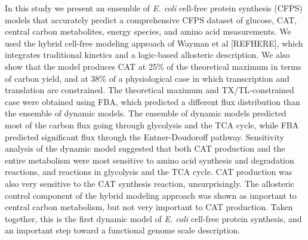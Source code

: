\documentclass[12pt]{article}
\begin{document}
In this study we present an ensemble of \textit{E. coli} cell-free protein synthesis (CFPS) models that accurately predict a comprehensive CFPS dataset of glucose, CAT, central carbon metabolites, energy species, and amino acid measurements.
We used the hybrid cell-free modeling approach of Wayman et al [REFHERE], which integrates traditional kinetics and a logic-based allosteric description.
We also show that the model produces CAT at 25\% of the theoretical maximum in terms of carbon yield, and at 38\% of a physiological case in which transcription and translation are constrained.
The theoretical maximum and TX/TL-constrained case were obtained using FBA, which predicted a different flux distribution than the ensemble of dynamic models.
The ensemble of dynamic models predicted most of the carbon flux going through glycolysis and the TCA cycle, while FBA predicted significant flux through the Entner-Doudoroff pathway.
Sensitivity analysis of the dynamic model suggested that both CAT production and the entire metabolism were most sensitive to amino acid synthesis and degradation reactions, and reactions in glycolysis and the TCA cycle.
CAT production was also very sensitive to the CAT synthesis reaction, unsurprisingly.
The allosteric control component of the hybrid modeling approach was shown as important to central carbon metabolism, but not very important to CAT production.
Taken together, this is the first dynamic model of \textit{E. coli} cell-free protein synthesis, and an important step toward a functional genome scale description.
\end{document}

